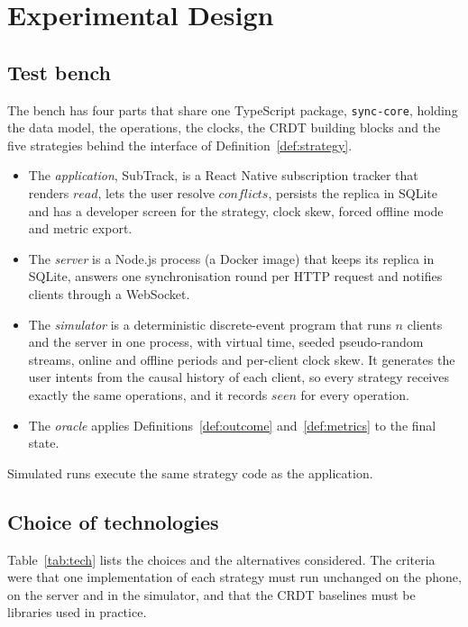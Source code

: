 \section{Experimental Design}\label{sec:setup}

\subsection{Test bench}
The bench has four parts that share one TypeScript package, \texttt{sync-core}, holding the data model, the
operations, the clocks, the CRDT building blocks and the five strategies behind the interface of
Definition~\ref{def:strategy}.
\begin{itemize}
\item The \emph{application}, SubTrack, is a React Native subscription tracker that renders $\mathit{read}$, lets
  the user resolve $\mathit{conflicts}$, persists the replica in SQLite and has a developer screen for the strategy,
  clock skew, forced offline mode and metric export.
\item The \emph{server} is a Node.js process (a Docker image) that keeps its replica in SQLite, answers one
  synchronisation round per HTTP request and notifies clients through a WebSocket.
\item The \emph{simulator} is a deterministic discrete-event program that runs $n$ clients and the server in one
  process, with virtual time, seeded pseudo-random streams, online and offline periods and per-client clock skew. It
  generates the user intents from the causal history of each client, so every strategy receives exactly the same
  operations, and it records $\mathit{seen}$ for every operation.
\item The \emph{oracle} applies Definitions~\ref{def:outcome} and~\ref{def:metrics} to the final state.
\end{itemize}
Simulated runs execute the same strategy code as the application.

\subsection{Choice of technologies}
Table~\ref{tab:tech} lists the choices and the alternatives considered. The criteria were that one implementation of
each strategy must run unchanged on the phone, on the server and in the simulator, and that the CRDT baselines must be
libraries used in practice.

